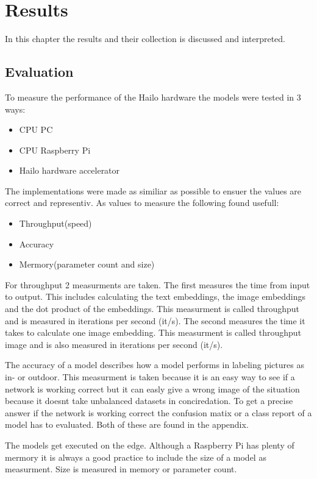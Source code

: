 \chapter{Results}
In this chapter the results and their collection is discussed and interpreted.

\section{Evaluation}

To measure the performance of the Hailo hardware the models were tested in 3 ways:
\begin{itemize}
    \item CPU PC
    \item CPU Raspberry Pi
    \item Hailo hardware accelerator
\end{itemize}
The implementations were made as similiar as possible to ensuer the values are correct and representiv. 
As values to measure the following found usefull:
\begin{itemize}
    \item Throughput(speed)
    \item Accuracy
    \item Mermory(parameter count and size) 
\end{itemize}

For throughput 2 measurments are taken.
The first measures the time from input to output.
This includes calculating the text embeddings, the image embeddings and the dot product of the embeddings.
This measurment is called throughput and is measured in iterations per second (it/s).
The second measures the time it takes to calculate one image embedding.
This measurment is called throughput image and is also measured in iterations per second (it/s).

The accuracy of a model describes how a model performs in labeling pictures as in- or outdoor.
This measurment is taken because it is an easy way to see if a network is working correct but it can easly give a wrong image of the situation because it doesnt take unbalanced datasets in conciredation.
To get a precise answer if the network is working correct the confusion matix or a class report of a model has to evaluated.
Both of these are found in the appendix.

The models get executed on the edge.
Although a Raspberry Pi has plenty of mermory it is always a good practice to include the size of a model as measurment.
Size is measured in memory or parameter count.

